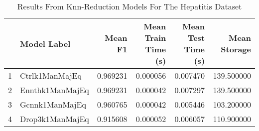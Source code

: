 \begin{table}
\centering
\caption{Results From Knn-Reduction Models For The Hepatitis Dataset}
\label{tab:knn_reduction_results_hepatitis}
\begin{tabular}{rlrrrr}
\toprule
 & Model Label & Mean F1 & Mean Train Time (s) & Mean Test Time (s) & Mean Storage \\
\midrule
1 & Ctrlk1ManMajEq & 0.969231 & 0.000056 & 0.007470 & 139.500000 \\
2 & Ennthk1ManMajEq & 0.969231 & 0.000042 & 0.007297 & 139.500000 \\
3 & Gcnnk1ManMajEq & 0.960765 & 0.000042 & 0.005446 & 103.200000 \\
4 & Drop3k1ManMajEq & 0.915608 & 0.000052 & 0.006057 & 110.900000 \\
\bottomrule
\end{tabular}
\end{table}
